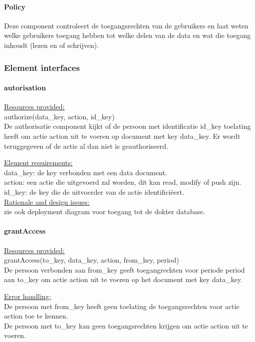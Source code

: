 \documentclass[a4paper,10pt]{article}
\begin{document}
\paragraph{Policy}
Deze component controleert de toegangsrechten van de gebruikers en laat weten welke gebruikers toegang hebben tot welke delen van de data en wat die toegang inhoudt (lezen en of schrijven).

\subsubsection{Element interfaces} 

\paragraph{autorisation}
\underline{Resources provided:}\\
authorize(data\_key, action, id\_key)\\
De authorisatie component kijkt of de persoon met identificatie id\_key toelating heeft om actie action uit te voeren op document met key data\_key.  Er wordt teruggegeven of de actie al dan niet is geauthoriseerd.

\underline{Element requirements:}\\
data\_key: de key verbonden met een data document.\\
action: een actie die uitgevoerd zal worden, dit kan read, modify of push zijn.\\
id\_key: de key die de uitvoerder van de actie identifici\"{e}ert.\\

\underline{Rationale and design issues:}\\
zie ook deployment diagram voor toegang tot de dokter database.

\paragraph{grantAccess}
\underline{Resources provided:}\\
grantAccess(to\_key, data\_key, action, from\_key, period)\\
De persoon verbonden aan from\_key geeft toegangrechten voor periode period aan to\_key om actie action uit te voeren op het document met key data\_key.

\underline{Error handling:}\\
De persoon met from\_key heeft geen toelating de toegangsrechten voor actie action toe te kennen.\\
De persoon met to\_key kan geen toegangsrechten krijgen om actie action uit te voeren.\\
\end{document}

